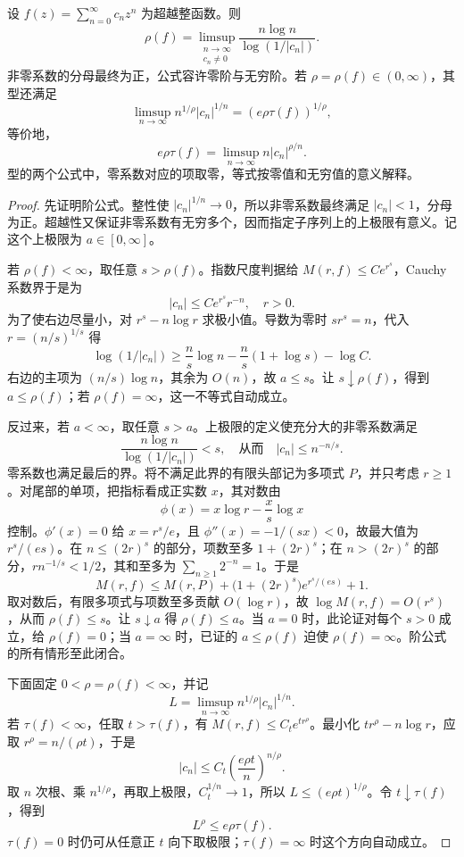 \begin{theorem}[增长的系数判据]\label{b3:thm:19-coefficient-growth}
设 \(f(z)=\sum_{n=0}^{\infty}c_nz^n\) 为超越整函数。则
\[
 \rho(f)=\limsup_{\substack{n\to\infty\\c_n\ne0}}
 \frac{n\log n}{\log(1/|c_n|)}.
\]
非零系数的分母最终为正，公式容许零阶与无穷阶。若 \(\rho=\rho(f)\in(0,\infty)\)，其型还满足
\[
 \limsup_{n\to\infty}n^{1/\rho}|c_n|^{1/n}
 =(e\rho\tau(f))^{1/\rho},
\]
等价地，
\[
 e\rho\tau(f)=\limsup_{n\to\infty}n|c_n|^{\rho/n}.
\]
型的两个公式中，零系数对应的项取零，等式按零值和无穷值的意义解释。
\end{theorem}
\begin{proof}
先证明阶公式。整性使 \(|c_n|^{1/n}\to0\)，所以非零系数最终满足 \(|c_n|<1\)，分母为正。超越性又保证非零系数有无穷多个，因而指定子序列上的上极限有意义。记这个上极限为 \(a\in[0,\infty]\)。

若 \(\rho(f)<\infty\)，取任意 \(s>\rho(f)\)。指数尺度判据给 \(M(r,f)\le C e^{r^s}\)，Cauchy 系数界于是为
\[
 |c_n|\le C e^{r^s}r^{-n},\quad r>0.
\]
为了使右边尽量小，对 \(r^s-n\log r\) 求极小值。导数为零时 \(sr^s=n\)，代入 \(r=(n/s)^{1/s}\) 得
\[
 \log(1/|c_n|)
 \ge\frac ns\log n-\frac ns(1+\log s)-\log C.
\]
右边的主项为 \((n/s)\log n\)，其余为 \(O(n)\)，故 \(a\le s\)。让 \(s\downarrow\rho(f)\)，得到 \(a\le\rho(f)\)；若 \(\rho(f)=\infty\)，这一不等式自动成立。

反过来，若 \(a<\infty\)，取任意 \(s>a\)。上极限的定义使充分大的非零系数满足
\[
 \frac{n\log n}{\log(1/|c_n|)}<s,
 \quad\text{从而}\quad |c_n|\le n^{-n/s}.
\]
零系数也满足最后的界。将不满足此界的有限头部记为多项式 \(P\)，并只考虑 \(r\ge1\)。对尾部的单项，把指标看成正实数 \(x\)，其对数由
\[
 \phi(x)=x\log r-\frac{x}{s}\log x
\]
控制。\(\phi'(x)=0\) 给 \(x=r^s/e\)，且 \(\phi''(x)=-1/(sx)<0\)，故最大值为 \(r^s/(es)\)。在 \(n\le(2r)^s\) 的部分，项数至多 \(1+(2r)^s\)；在 \(n>(2r)^s\) 的部分，\(r n^{-1/s}<1/2\)，其和至多为 \(\sum_{n\ge1}2^{-n}=1\)。于是
\[
 M(r,f)\le M(r,P)+\bigl(1+(2r)^s\bigr)e^{r^s/(es)}+1.
\]
取对数后，有限多项式与项数至多贡献 \(O(\log r)\)，故 \(\log M(r,f)=O(r^s)\)，从而 \(\rho(f)\le s\)。让 \(s\downarrow a\) 得 \(\rho(f)\le a\)。当 \(a=0\) 时，此论证对每个 \(s>0\) 成立，给 \(\rho(f)=0\)；当 \(a=\infty\) 时，已证的 \(a\le\rho(f)\) 迫使 \(\rho(f)=\infty\)。阶公式的所有情形至此闭合。

下面固定 \(0<\rho=\rho(f)<\infty\)，并记
\[
 L=\limsup_{n\to\infty}n^{1/\rho}|c_n|^{1/n}.
\]
若 \(\tau(f)<\infty\)，任取 \(t>\tau(f)\)，有 \(M(r,f)\le C_t e^{t r^\rho}\)。最小化 \(t r^\rho-n\log r\)，应取 \(r^\rho=n/(\rho t)\)，于是
\[
 |c_n|\le C_t\left(\frac{e\rho t}{n}\right)^{n/\rho}.
\]
取 \(n\) 次根、乘 \(n^{1/\rho}\)，再取上极限，\(C_t^{1/n}\to1\)，所以 \(L\le(e\rho t)^{1/\rho}\)。令 \(t\downarrow\tau(f)\)，得到
\[
 L^\rho\le e\rho\tau(f).
\]
\(\tau(f)=0\) 时仍可从任意正 \(t\) 向下取极限；\(\tau(f)=\infty\) 时这个方向自动成立。


\end{proof}
